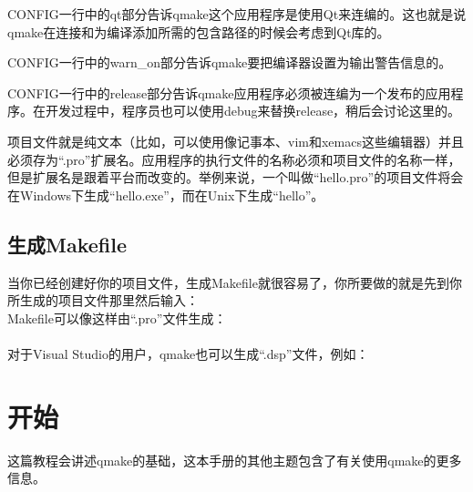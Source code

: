 CONFIG一行中的qt部分告诉qmake这个应用程序是使用Qt来连编的。这也就是说qmake在连接和为编译添加所需的包含路径的时候会考虑到Qt库的。\par
CONFIG一行中的warn\_on部分告诉qmake要把编译器设置为输出警告信息的。\par
CONFIG一行中的release部分告诉qmake应用程序必须被连编为一个发布的应用程序。在开发过程中，程序员也可以使用debug来替换release，稍后会讨论这里的。\par
项目文件就是纯文本（比如，可以使用像记事本、vim和xemacs这些编辑器）并且必须存为“.pro”扩展名。应用程序的执行文件的名称必须和项目文件的名称一样，但是扩展名是跟着平台而改变的。举例来说，一个叫做“hello.pro”的项目文件将会在Windows下生成“hello.exe”，而在Unix下生成“hello”。

\subsection{生成Makefile}
当你已经创建好你的项目文件，生成Makefile就很容易了，你所要做的就是先到你所生成的项目文件那里然后输入：\\
Makefile可以像这样由“.pro”文件生成：\\
{\color{seagreen}{
    qmake -o Makefile hello.pro
  }}\\
对于Visual Studio的用户，qmake也可以生成“.dsp”文件，例如：\\
{\color{seagreen}{
    qmake -t vcapp -o hello.dsp hello.pro

  }}

\section{开始}
这篇教程会讲述qmake的基础，这本手册的其他主题包含了有关使用qmake的更多信息。
